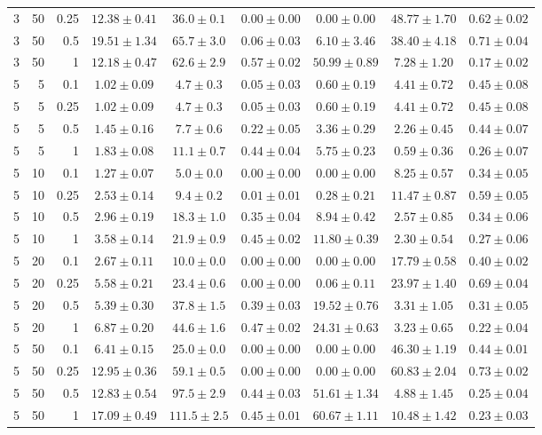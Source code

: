 \begin{table}[htbp]
\begin{tabular}{@{}rrrcccccc@{}}
3 & 50 & 0.25 & $12.38 \pm 0.41$ & $36.0 \pm 0.1$ & $0.00 \pm 0.00$ & $0.00 \pm 0.00$ & $48.77 \pm 1.70$ & $0.62 \pm 0.02$ \\
3 & 50 & 0.5 & $19.51 \pm 1.34$ & $65.7 \pm 3.0$ & $0.06 \pm 0.03$ & $6.10 \pm 3.46$ & $38.40 \pm 4.18$ & $0.71 \pm 0.04$ \\
3 & 50 & 1 & $12.18 \pm 0.47$ & $62.6 \pm 2.9$ & $0.57 \pm 0.02$ & $50.99 \pm 0.89$ & $7.28 \pm 1.20$ & $0.17 \pm 0.02$ \\
\midrule
5 & 5 & 0.1 & $1.02 \pm 0.09$ & $4.7 \pm 0.3$ & $0.05 \pm 0.03$ & $0.60 \pm 0.19$ & $4.41 \pm 0.72$ & $0.45 \pm 0.08$ \\
5 & 5 & 0.25 & $1.02 \pm 0.09$ & $4.7 \pm 0.3$ & $0.05 \pm 0.03$ & $0.60 \pm 0.19$ & $4.41 \pm 0.72$ & $0.45 \pm 0.08$ \\
5 & 5 & 0.5 & $1.45 \pm 0.16$ & $7.7 \pm 0.6$ & $0.22 \pm 0.05$ & $3.36 \pm 0.29$ & $2.26 \pm 0.45$ & $0.44 \pm 0.07$ \\
5 & 5 & 1 & $1.83 \pm 0.08$ & $11.1 \pm 0.7$ & $0.44 \pm 0.04$ & $5.75 \pm 0.23$ & $0.59 \pm 0.36$ & $0.26 \pm 0.07$ \\
5 & 10 & 0.1 & $1.27 \pm 0.07$ & $5.0 \pm 0.0$ & $0.00 \pm 0.00$ & $0.00 \pm 0.00$ & $8.25 \pm 0.57$ & $0.34 \pm 0.05$ \\
5 & 10 & 0.25 & $2.53 \pm 0.14$ & $9.4 \pm 0.2$ & $0.01 \pm 0.01$ & $0.28 \pm 0.21$ & $11.47 \pm 0.87$ & $0.59 \pm 0.05$ \\
5 & 10 & 0.5 & $2.96 \pm 0.19$ & $18.3 \pm 1.0$ & $0.35 \pm 0.04$ & $8.94 \pm 0.42$ & $2.57 \pm 0.85$ & $0.34 \pm 0.06$ \\
5 & 10 & 1 & $3.58 \pm 0.14$ & $21.9 \pm 0.9$ & $0.45 \pm 0.02$ & $11.80 \pm 0.39$ & $2.30 \pm 0.54$ & $0.27 \pm 0.06$ \\
5 & 20 & 0.1 & $2.67 \pm 0.11$ & $10.0 \pm 0.0$ & $0.00 \pm 0.00$ & $0.00 \pm 0.00$ & $17.79 \pm 0.58$ & $0.40 \pm 0.02$ \\
5 & 20 & 0.25 & $5.58 \pm 0.21$ & $23.4 \pm 0.6$ & $0.00 \pm 0.00$ & $0.06 \pm 0.11$ & $23.97 \pm 1.40$ & $0.69 \pm 0.04$ \\
5 & 20 & 0.5 & $5.39 \pm 0.30$ & $37.8 \pm 1.5$ & $0.39 \pm 0.03$ & $19.52 \pm 0.76$ & $3.31 \pm 1.05$ & $0.31 \pm 0.05$ \\
5 & 20 & 1 & $6.87 \pm 0.20$ & $44.6 \pm 1.6$ & $0.47 \pm 0.02$ & $24.31 \pm 0.63$ & $3.23 \pm 0.65$ & $0.22 \pm 0.04$ \\
5 & 50 & 0.1 & $6.41 \pm 0.15$ & $25.0 \pm 0.0$ & $0.00 \pm 0.00$ & $0.00 \pm 0.00$ & $46.30 \pm 1.19$ & $0.44 \pm 0.01$ \\
5 & 50 & 0.25 & $12.95 \pm 0.36$ & $59.1 \pm 0.5$ & $0.00 \pm 0.00$ & $0.00 \pm 0.00$ & $60.83 \pm 2.04$ & $0.73 \pm 0.02$ \\
5 & 50 & 0.5 & $12.83 \pm 0.54$ & $97.5 \pm 2.9$ & $0.44 \pm 0.03$ & $51.61 \pm 1.34$ & $4.88 \pm 1.45$ & $0.25 \pm 0.04$ \\
5 & 50 & 1 & $17.09 \pm 0.49$ & $111.5 \pm 2.5$ & $0.45 \pm 0.01$ & $60.67 \pm 1.11$ & $10.48 \pm 1.42$ & $0.23 \pm 0.03$ \\
\bottomrule
\end{tabular}
\end{table}
